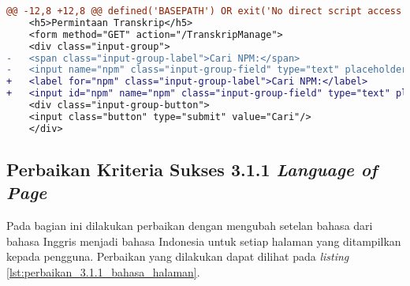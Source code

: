 \begin{lstlisting}[frame=single, label={lst:perbaikan_2.5.3_label_dan_nama_pada_komponen_masukan}, language=diff, caption=Perbaikan Kriteria Sukses 2.5.3 - Label dan Nama Pada Komponen Masukan]
@@ -12,8 +12,8 @@ defined('BASEPATH') OR exit('No direct script access allowed');
    <h5>Permintaan Transkrip</h5>
    <form method="GET" action="/TranskripManage">
    <div class="input-group">
-   <span class="input-group-label">Cari NPM:</span>
-   <input name="npm" class="input-group-field" type="text" placeholder="2013730013" maxlength="10" minlength="10"<?= $npmQuery === NULL ? '' : " value='$npmQuery'" ?>/>
+   <label for="npm" class="input-group-label">Cari NPM:</label>
+   <input id="npm" name="npm" class="input-group-field" type="text" placeholder="2013730013" maxlength="10" minlength="10"<?= $npmQuery === NULL ? '' : " value='$npmQuery'" ?>/>
    <div class="input-group-button">
    <input class="button" type="submit" value="Cari"/>
    </div>
\end{lstlisting} 

\subsection{Perbaikan Kriteria Sukses 3.1.1 \textit{Language of Page}}
\label{subsec:perbaikan_kriteria_sukses_3.1.1}
Pada bagian ini dilakukan perbaikan dengan mengubah setelan bahasa dari bahasa Inggris menjadi bahasa Indonesia untuk setiap halaman yang ditampilkan kepada pengguna. Perbaikan yang dilakukan dapat dilihat pada \textit{listing} \ref{lst:perbaikan_3.1.1_bahasa_halaman}.

